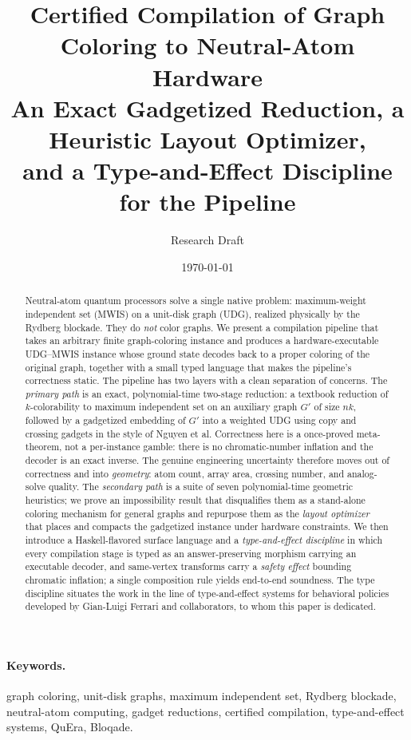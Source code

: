 \documentclass[11pt]{article}
\title{%
  \textbf{Certified Compilation of Graph Coloring to Neutral-Atom Hardware}\\[0.45em]
  \large An Exact Gadgetized Reduction, a Heuristic Layout Optimizer,\\
  and a Type-and-Effect Discipline for the Pipeline}
\author{Research Draft}
\date{\today}
\theoremstyle{definition}
\theoremstyle{remark}
\begin{document}
\maketitle

\begin{abstract}
Neutral-atom quantum processors solve a single native problem: maximum-weight
independent set (MWIS) on a unit-disk graph (UDG), realized physically by the
Rydberg blockade. They do \emph{not} color graphs. We present a compilation pipeline
that takes an arbitrary finite graph-coloring instance and produces a
hardware-executable UDG--MWIS instance whose ground state decodes back to a proper
coloring of the original graph, together with a small typed language that makes the
pipeline's correctness static. The pipeline has two layers with a clean separation
of concerns. The \emph{primary path} is an exact, polynomial-time two-stage
reduction: a textbook reduction of $k$-colorability to maximum independent set on an
auxiliary graph $G'$ of size $nk$, followed by a gadgetized embedding of $G'$ into a
weighted UDG using copy and crossing gadgets in the style of Nguyen et al.
Correctness here is a once-proved meta-theorem, not a per-instance gamble: there is
no chromatic-number inflation and the decoder is an exact inverse. The genuine
engineering uncertainty therefore moves out of correctness and into \emph{geometry}:
atom count, array area, crossing number, and analog-solve quality. The
\emph{secondary path} is a suite of seven polynomial-time geometric heuristics; we
prove an impossibility result that disqualifies them as a stand-alone coloring
mechanism for general graphs and repurpose them as the \emph{layout optimizer} that
places and compacts the gadgetized instance under hardware constraints. We then
introduce a Haskell-flavored surface language and a \emph{type-and-effect discipline}
in which every compilation stage is typed as an answer-preserving morphism carrying
an executable decoder, and same-vertex transforms carry a \emph{safety effect}
bounding chromatic inflation; a single composition rule yields end-to-end soundness.
The type discipline situates the work in the line of type-and-effect systems for
behavioral policies developed by Gian-Luigi Ferrari and collaborators, to whom this
paper is dedicated.
\end{abstract}

\paragraph{Keywords.} graph coloring, unit-disk graphs, maximum independent set,
Rydberg blockade, neutral-atom computing, gadget reductions, certified compilation,
type-and-effect systems, QuEra, Bloqade.
\end{document}

